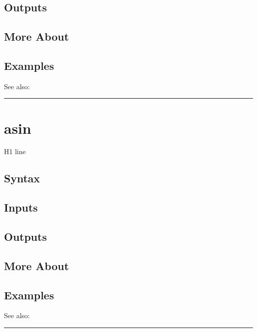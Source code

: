 \documentclass[letterpaper,10pt,english]{sphinxmanual}
\begin{document}
\subsection{Outputs}
\label{classes/time_series/@ts/ts:id44}

\subsection{More About}
\label{classes/time_series/@ts/ts:id45}

\subsection{Examples}
\label{classes/time_series/@ts/ts:id46}
See also:


\bigskip\hrule{}\bigskip



\section{asin}
\label{classes/time_series/@ts/ts:id47}\label{classes/time_series/@ts/ts:asin}
H1 line


\subsection{Syntax}
\label{classes/time_series/@ts/ts:id48}

\subsection{Inputs}
\label{classes/time_series/@ts/ts:id49}

\subsection{Outputs}
\label{classes/time_series/@ts/ts:id50}

\subsection{More About}
\label{classes/time_series/@ts/ts:id51}

\subsection{Examples}
\label{classes/time_series/@ts/ts:id52}
See also:


\bigskip\hrule{}\bigskip
\end{document}
